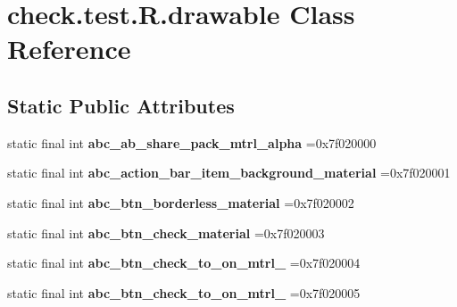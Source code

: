 \hypertarget{classcheck_1_1test_1_1_r_1_1drawable}{}\section{check.\+test.\+R.\+drawable Class Reference}
\label{classcheck_1_1test_1_1_r_1_1drawable}
\subsection*{Static Public Attributes}
\begin{DoxyCompactItemize}
\item 
\hypertarget{classcheck_1_1test_1_1_r_1_1drawable_a79cd7f71990a5c6c5fd3a8419ddea9a2}{}static final int {\bfseries abc\+\_\+ab\+\_\+share\+\_\+pack\+\_\+mtrl\+\_\+alpha} =0x7f020000\label{classcheck_1_1test_1_1_r_1_1drawable_a79cd7f71990a5c6c5fd3a8419ddea9a2}

\item 
\hypertarget{classcheck_1_1test_1_1_r_1_1drawable_a4618e66be8ee4bad0e2ea014769ac822}{}static final int {\bfseries abc\+\_\+action\+\_\+bar\+\_\+item\+\_\+background\+\_\+material} =0x7f020001\label{classcheck_1_1test_1_1_r_1_1drawable_a4618e66be8ee4bad0e2ea014769ac822}

\item 
\hypertarget{classcheck_1_1test_1_1_r_1_1drawable_a2e99fb86c013d8a64ca5cd79383d0d8f}{}static final int {\bfseries abc\+\_\+btn\+\_\+borderless\+\_\+material} =0x7f020002\label{classcheck_1_1test_1_1_r_1_1drawable_a2e99fb86c013d8a64ca5cd79383d0d8f}

\item 
\hypertarget{classcheck_1_1test_1_1_r_1_1drawable_ad22e55bdbbe282bb9576ac93519e02b6}{}static final int {\bfseries abc\+\_\+btn\+\_\+check\+\_\+material} =0x7f020003\label{classcheck_1_1test_1_1_r_1_1drawable_ad22e55bdbbe282bb9576ac93519e02b6}

\item 
\hypertarget{classcheck_1_1test_1_1_r_1_1drawable_adb4ff16cf10a19a26bd551bf32671fb1}{}static final int {\bfseries abc\+\_\+btn\+\_\+check\+\_\+to\+\_\+on\+\_\+mtrl\+\_} =0x7f020004\label{classcheck_1_1test_1_1_r_1_1drawable_adb4ff16cf10a19a26bd551bf32671fb1}

\item 
\hypertarget{classcheck_1_1test_1_1_r_1_1drawable_a98f84a4c1da1b0e87259d20381206567}{}static final int {\bfseries abc\+\_\+btn\+\_\+check\+\_\+to\+\_\+on\+\_\+mtrl\+\_} =0x7f020005\label{classcheck_1_1test_1_1_r_1_1drawable_a98f84a4c1da1b0e87259d20381206567}


\end{DoxyCompactItemize}
